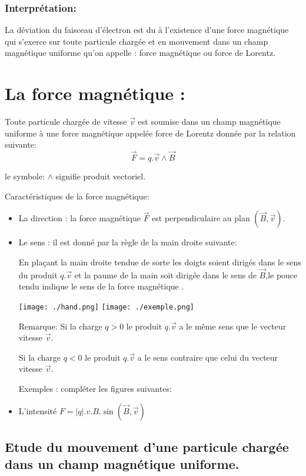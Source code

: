 \documentclass[12pt]{article}
\begin{document}
\subsubsection{Interprétation: }
La déviation du faisceau d'électron est du à l'existence d'une force magnétique qui s'exerce sur toute particule chargée
et en mouvement dans un champ magnétique uniforme qu'on appelle : force magnétique ou force de Lorentz.

\section{La force magnétique : }
Toute particule chargée de vitesse $\vec{v}$
est soumise dans un champ magnétique uniforme à une force magnétique appelée force de Lorentz donnée par la relation suivante:
$$\vec{F} = q.\vec{v} \wedge \vec{B} $$

le symbole: $\wedge$ signifie produit vectoriel.

Caractéristiques de la force magnétique:
\begin{itemize}
	\item La direction : la force magnétique $\vec{F}$ est perpendiculaire au plan $(\vec{B}, \vec{v})$.
	\item Le sens : il est donné par la règle de la main droite suivante:

		En plaçant la main droite tendue de sorte les doigts soient dirigés dans le sens du produit $q.\vec{v}$ et la paume de la main soit dirigée dans le sens de $\vec{B}$,le pouce tendu indique le sens de la force magnétique . 
		\begin{center}
			\texttt{[image: ./hand.png]}
			\texttt{[image: ./exemple.png]}
		\end{center}
		Remarque: Si la charge $q>0$ le produit $q.\vec{v}$ a le même sens que le vecteur vitesse $\vec{v}$.

 Si la charge $q < 0$ le produit $q.\vec{v}$ a le sens contraire que celui du  vecteur vitesse $\vec{v}$.


 Exemples : compléter les figures suivantes: 

\item L'intensité $F = |q|.v.B.\sin(\vec{B},\vec{v})$

\end{itemize}
\subsection{Etude du mouvement d'une particule chargée dans un champ magnétique
uniforme.}
\end{document}
